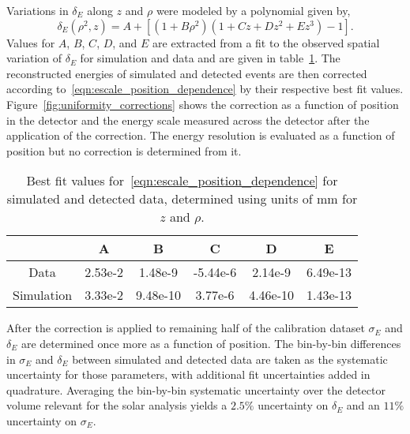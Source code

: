 Variations in $\delta_{E}$ along $z$ and $\rho$ were modeled by a polynomial given by,
\begin{equation}
    \delta_{E}(\rho^{2}, z) = A + \left[(1+B\rho^{2})(1+Cz+Dz^{2}+Ez^{3}) - 1\right]\text{.}
    \label{eqn:escale_position_dependence}
\end{equation}
Values for $A$, $B$, $C$, $D$, and $E$ are extracted from a fit to the observed
spatial variation of $\delta_{E}$ for simulation and data and are given in
table~\ref{tbl:n16_position_escale}.
The reconstructed energies of simulated and detected 
events are then corrected according to~\eqref{eqn:escale_position_dependence} by
their respective best fit values.
Figure~\ref{fig:uniformity_corrections} shows the correction as a function of
position in the detector and the energy scale measured across the detector
after the application of the correction.
The energy resolution is evaluated as a function of position but no correction
is determined from it.
\begin{table}
    \centering
\begin{tabular}{|c | c | c | c |c|c|}
\hline
& A&B&C&D&E\\
\hline
Data& 2.53e-2& 1.48e-9 & -5.44e-6 & 2.14e-9 & 6.49e-13\\
Simulation& 3.33e-2& 9.48e-10& 3.77e-6& 4.46e-10& 1.43e-13\\
\hline
\end{tabular}
\caption{Best fit values for~\eqref{eqn:escale_position_dependence} for
simulated and detected data, determined using units of mm for $z$ and $\rho$.}
\label{tbl:n16_position_escale}
\end{table}

After the correction is applied to remaining half of the calibration dataset
$\sigma_{E}$ and $\delta_{E}$ are determined once more as a function of position.
The bin-by-bin differences in $\sigma_{E}$ and $\delta_{E}$ between
simulated and detected data are taken as the systematic uncertainty for those
parameters, with additional fit uncertainties added in quadrature.
Averaging the bin-by-bin systematic uncertainty over the detector volume relevant
for the solar analysis yields a $2.5\%$ uncertainty on $\delta_{E}$ and an
$11\%$ uncertainty on $\sigma_{E}$.

